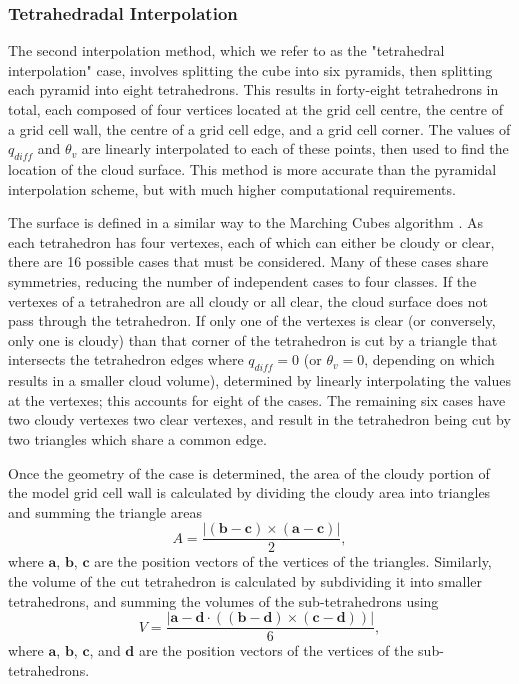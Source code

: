 \documentclass[12pt]{article}
\begin{document}

\subsubsection{Tetrahedradal Interpolation}

The second interpolation method, which we refer to as the "tetrahedral 
interpolation" case, involves splitting the cube into six pyramids, then 
splitting each pyramid into eight tetrahedrons. This results in forty-eight 
tetrahedrons in total, each composed of four vertices located at the grid cell 
centre, the centre of a grid cell wall, the centre of a grid cell edge, and 
a grid cell corner.  The values of $q_{diff}$ and $\theta_v$ are linearly 
interpolated to each of these points, then used to find the location of the 
cloud surface.  This method is more accurate than the pyramidal interpolation 
scheme, but with much higher computational requirements.

The surface is defined in a similar way to the Marching Cubes algorithm 
\citep{Lorensen1987}.  As each tetrahedron has four vertexes, each of which can
either be cloudy or clear, there are 16 possible cases that must be considered. 
Many of these cases share symmetries, reducing the number of independent cases 
to four classes.  If the vertexes of a tetrahedron are all cloudy or all clear, 
the cloud surface does not pass through the tetrahedron.  If only one of the 
vertexes is clear (or conversely, only one is cloudy) than that corner of the 
tetrahedron is cut by a triangle that intersects the tetrahedron edges where 
$q_{diff}=0$ (or $\theta_v = 0$, depending on which results in a smaller cloud 
volume), determined by linearly interpolating the values at the vertexes; this 
accounts for eight of the cases.  The remaining six cases have two cloudy 
vertexes two clear vertexes, and result in the tetrahedron being cut by two 
triangles which share a common edge.

Once the geometry of the case is determined, the area of the cloudy portion of
the model grid cell wall is calculated by dividing the cloudy area into 
triangles and summing the triangle areas
\begin{equation}
A = \frac{|(\mathbf{b - c}) \times (\mathbf{a - c})|}{2},
\end{equation}
where $\mathbf{a}$, $\mathbf{b}$, $\mathbf{c}$ are the position vectors of the 
vertices of the triangles.  Similarly, the volume of the cut tetrahedron is 
calculated by subdividing it into smaller tetrahedrons, and summing the volumes 
of the sub-tetrahedrons using
\begin{equation}
V = \frac{|\mathbf{a - d} \cdot ((\mathbf{b - d}) \times (\mathbf{c - d}))|}{6},
\end{equation}
where $\mathbf{a}$, $\mathbf{b}$, $\mathbf{c}$, and $\mathbf{d}$ are the 
position vectors of the vertices of the sub-tetrahedrons.
\end{document}
